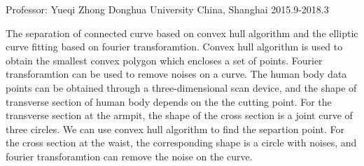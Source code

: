 \begin{cventries}
  \cventry
    {Professor: Yueqi Zhong} %
    {Donghua University} %
    {China, Shanghai} %
    {2015.9-2018.3} %
    {
      \begin{cvitems} %
        \item
			{
				The separation of connected curve based on convex hull algorithm
				and the elliptic curve fitting based on fourier transforamtion. 
				Convex hull algorithm is used to obtain the smallest convex
				polygon which encloses a set of points. Fourier transforamtion
				can be used to remove noises on a curve. The human body data
				points can be obtained through a three-dimensional scan device, 
				and the shape of transverse section of human body depends on the
				the cutting point. For the transverse section at the armpit, the
				shape of the cross section is a joint curve of three circles. We
				can use convex hull algorithm to find the separtion point. For
				the cross section at the waist, the corresponding shape is a
				circle with noises, and fourier transforamtion can remove the
				noise on the curve.
			}
      \end{cvitems}
    }

\end{cventries}
